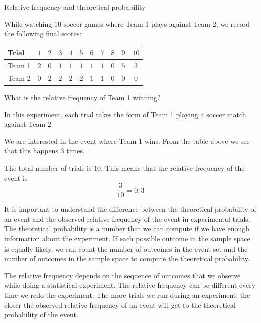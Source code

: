 \begin{wex}{Relative frequency and theoretical probability}
{While watching $10$ soccer games where Team 1 plays against Team 2, we
  record the following final scores:
    \begin{center}
      \begin{tabular}{lcccccccccc}
        \toprule
        Trial  & $1$ & $2$ & $3$ & $4$ & $5$ & $6$ & $7$ & $8$ & $9$ & $10$ \\
        \midrule
        Team 1 & $2$ & $0$ & $1$ & $1$ & $1$ & $1$ & $1$ & $0$ & $5$ & $3$ \\
        Team 2 & $0$ & $2$ & $2$ & $2$ & $2$ & $1$ & $1$ & $0$ & $0$ & $0$ \\
        \bottomrule
      \end{tabular}
    \end{center}

What is the relative frequency of Team 1 winning?
}
{In this experiment, each trial takes the form of Team 1 playing a
  soccer match against Team 2.


  We are interested in the event where Team 1 wins. From the table
  above we see that this happens $3$ times.


  The total number of trials is $10$. This means that the relative
  frequency of the event is \[\frac{3}{10} = 0,3\]
}
\end{wex}

It is important to understand the difference between the theoretical
probability of an event and the observed relative frequency of the
event in experimental trials. The theoretical probability is a number
that we can compute if we have enough information about the
experiment. If each possible outcome in the sample space is
equally likely, we can count the number of outcomes in the event set
and the number of outcomes in the sample space to compute the
theoretical probability.\par

The relative frequency depends on the sequence of outcomes that we
observe while doing a statistical experiment. The relative frequency
can be different every time we redo the experiment. The more trials we
run during an experiment, the closer the observed relative frequency
of an event will get to the theoretical probability of the event.\par

